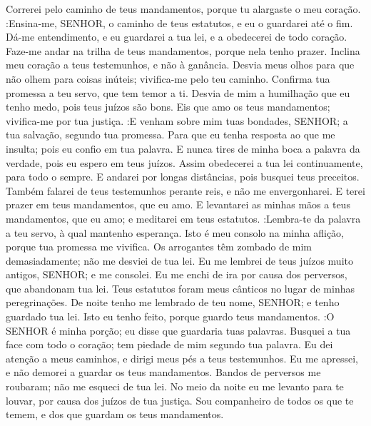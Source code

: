 {Correrei pelo caminho de teus mandamentos, porque tu alargaste o meu coração.
 :Ensina-me, SENHOR, o caminho de teus estatutos, e eu o guardarei até o fim.
Dá-me entendimento, e eu guardarei a tua lei, e a obedecerei de todo
{} coração.
Faze-me andar na trilha de teus mandamentos, porque nela tenho prazer.
Inclina meu coração a teus testemunhos, e não à ganância.
Desvia meus olhos para que não olhem para coisas inúteis; vivifica-me pelo teu caminho.
Confirma tua promessa a teu servo, que tem temor a ti.
Desvia de mim a humilhação que eu tenho medo, pois teus juízos são bons.
Eis que amo os teus mandamentos; vivifica-me por tua justiça.
 :E venham sobre mim tuas bondades, SENHOR;
{} a tua salvação, segundo tua promessa.
Para que eu tenha resposta ao que me insulta; pois eu confio em tua palavra.
E nunca tires de minha boca a palavra da verdade, pois eu espero em teus juízos.
Assim obedecerei a tua lei continuamente, para todo o sempre.
E andarei
{} por longas distâncias, pois busquei teus preceitos.
Também falarei de teus testemunhos perante reis, e não me envergonharei.
E terei prazer em teus mandamentos, que eu amo.
E levantarei as minhas mãos a teus mandamentos, que eu amo; e meditarei em teus estatutos.
 :Lembra-te da palavra
{} a teu servo, à qual mantenho esperança.
Isto é meu consolo na minha aflição, porque tua promessa me vivifica.
Os arrogantes têm zombado de mim demasiadamente;
{} não me desviei de tua lei.
Eu me lembrei de teus juízos muito antigos, SENHOR; e
{} me consolei.
Eu me enchi de ira por causa dos perversos, que abandonam tua lei.
Teus estatutos foram meus cânticos no lugar de minhas peregrinações.
De noite tenho me lembrado de teu nome, SENHOR; e tenho guardado tua lei.
Isto eu tenho feito, porque guardo teus mandamentos.
 :O SENHOR é minha porção; eu disse que guardaria tuas palavras.
Busquei a tua face com todo o
{} coração; tem piedade de mim segundo tua palavra.
Eu dei atenção a meus caminhos, e dirigi meus pés a teus testemunhos.
Eu me apressei, e não demorei a guardar os teus mandamentos.
Bandos de perversos me roubaram;
{} não me esqueci de tua lei.
No meio da noite eu me levanto para te louvar, por causa dos juízos de tua justiça.
Sou companheiro de todos os que te temem, e dos que guardam os teus mandamentos.
}
